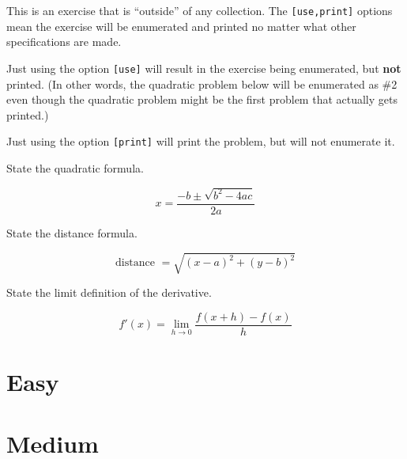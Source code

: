 \documentclass{article}
\begin{document}
\begin{exercise}[print]
  This is an exercise that is ``outside'' of any collection.
  The \texttt{[use,print]} options mean the exercise will be enumerated and printed no matter what other specifications are made.

  Just using the option \texttt{[use]} will result in the exercise being enumerated, but \textbf{not} printed.
  (In other words, the quadratic problem below will be enumerated as \#2 even though the quadratic problem might be the first problem that actually gets printed.)

  Just using the option \texttt{[print]} will print the problem, but will not
  enumerate it.
\end{exercise}



\begin{exercise}[difficulty=easy,points=1]
  State the quadratic formula.
\end{exercise}
\begin{solution}
  \[ x=\frac{-b\pm\sqrt{b^2-4ac}}{2a} \]
\end{solution}

\begin{exercise}[difficulty=medium,points=1]
  State the distance formula.
\end{exercise}
\begin{solution}
  \[ \text{distance }=\sqrt{(x-a)^2+(y-b)^2} \]
\end{solution}


\begin{exercise}[difficulty=easy,points=1]
  State the limit definition of the derivative.
\end{exercise}
\begin{solution}
  \[ f'(x)=\lim_{h\to 0}\frac{f(x+h)-f(x)}{h} \]
\end{solution}




\section{Easy}

\section{Medium}

\printsolutions[difficulty=medium]
\end{document}
